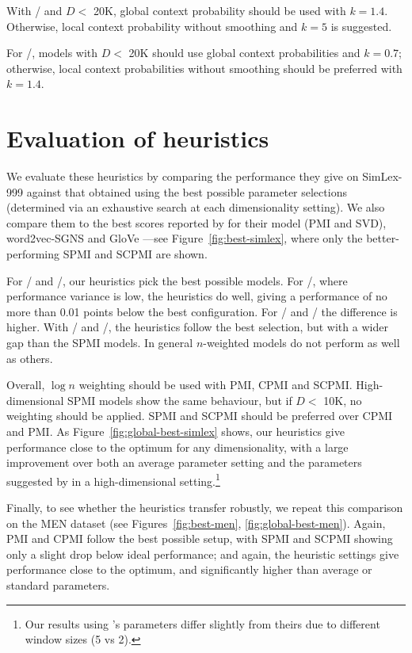 \documentclass[11pt]{article}
\begin{document}
With \NSCPMI/ and $D<$ 20K, global context probability should be used with $k = 1.4$. Otherwise, local context probability without smoothing and $k = 5$ is suggested.

For \logNSCPMI/, models with $D<$ 20K should use global context probabilities and $k = 0.7$; otherwise, local context probabilities without smoothing should be preferred with $k = 1.4$.



\section{Evaluation of heuristics}
\label{sec:heuristic-evaluation}

We evaluate these heuristics by comparing the performance they give on SimLex-999 against that obtained using the best possible parameter selections (determined via an exhaustive search at each dimensionality setting). We also compare them to the best scores reported by  for their model (PMI and SVD), word2vec-SGNS \cite{mikolov2013efficient} and GloVe \cite{pennington2014glove}---see Figure~\ref{fig:best-simlex}, where only the better-performing SPMI and SCPMI are shown.

For \logNPMI/ and \logNCPMI/, our heuristics pick the best possible models. For \logNSPMI/, where performance variance is low, the heuristics do well, giving a performance of no more than 0.01 points below the best configuration. For \SPMI/ and \NSPMI/ the difference is higher. With \logNSCPMI/ and \SCPMI/, the heuristics follow the best selection, but with a wider gap than the SPMI models. In general $n$-weighted models do not perform as well as others.

Overall, $\log n$ weighting should be used with PMI, CPMI and SCPMI. High-dimensional SPMI models show the same behaviour, but if $D<$ 10K, no weighting should be applied. SPMI and SCPMI should be preferred over CPMI and PMI. As Figure~\ref{fig:global-best-simlex} shows, our heuristics give performance close to the optimum for any dimensionality, with a large improvement over both an average parameter setting and the parameters suggested by  in a high-dimensional setting.\footnote{Our results using 's parameters differ slightly from theirs due to different window sizes (5 vs 2).}

Finally, to see whether the heuristics transfer robustly, we repeat this comparison on the MEN dataset (see Figures~\ref{fig:best-men}, \ref{fig:global-best-men}). Again, PMI and CPMI follow the best possible setup, with SPMI and SCPMI showing only a slight drop below ideal performance; and again, the heuristic settings give performance close to the optimum, and significantly higher than average or standard parameters.
\end{document}
